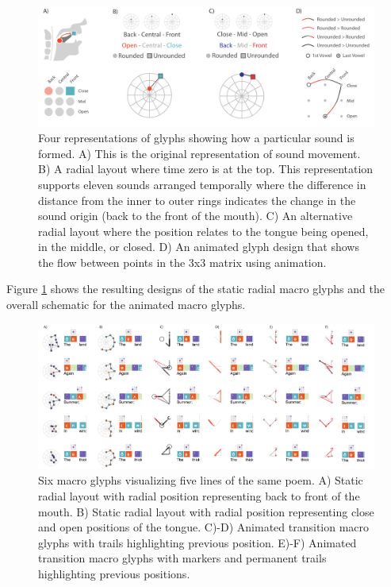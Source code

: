 \begin{figure}[h!]
\centering
\includegraphics[width=\textwidth]{images/other_glyphs/poem_macro_design}
\caption{Four representations of glyphs showing how a particular sound is formed.
A) This is the original representation of sound movement.
B) A radial layout where time zero is at the top. This representation supports eleven sounds arranged temporally where the difference in distance from the inner to outer rings indicates the change in the sound origin (back to the front of the mouth).
C) An alternative radial layout where the position relates to the tongue being opened, in the middle, or closed.
D) An animated glyph design that shows the flow between points in the 3x3 matrix using animation.}
\label{fig:macro_glyph}
\end{figure}

Figure \ref{fig:macro_glyph} shows the resulting designs of the static radial macro glyphs and the overall schematic for the animated macro glyphs.
 

\begin{figure}[h!]
\centering
\includegraphics[width=\textwidth]{images/other_glyphs/macros_options}
\caption{Six macro glyphs visualizing five lines of the same poem. 
A) Static radial layout with radial position representing back to front of the mouth.
B) Static radial layout with radial position representing close and open positions of the tongue.
C)-D) Animated transition macro glyphs with trails highlighting previous position. 
E)-F) Animated transition macro glyphs with markers and permanent trails highlighting previous positions.
}
\label{fig:macro_glyph_implementation}
\end{figure}


